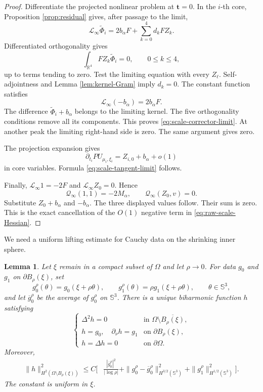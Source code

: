 \documentclass[11pt]{article}
\newtheorem{lemma}[theorem]{Lemma}
\numberwithin{equation}{section}
\begin{document}
\begin{proof}
Differentiate the projected nonlinear problem at $\boldsymbol t=0$. In the $i$-th core, Proposition \ref{prop:residual} gives, after passage to the limit,
\[
\mathcal L_\infty\widetilde\Phi_i
=2b_\alpha F+\sum_{k=0}^{4}d_kFZ_k.
\]
Differentiated orthogonality gives
\[
\int_{\mathbb R^4}FZ_k\widetilde\Phi_i=0,
\qquad 0\leq k\leq4,
\]
up to terms tending to zero. Test the limiting equation with every $Z_\ell$. Self-adjointness and Lemma \ref{lem:kernel-Gram} imply $d_k=0$. The constant function satisfies
\[
\mathcal L_\infty(-b_\alpha)=2b_\alpha F.
\]
The difference $\widetilde\Phi_i+b_\alpha$ belongs to the limiting kernel. The five orthogonality conditions remove all its components. This proves \eqref{eq:scale-corrector-limit}. At another peak the limiting right-hand side is zero. The same argument gives zero.

The projection expansion gives
\[
\partial_{t_i}PU_{\mu_i,\xi_i}
=Z_{i,0}+b_\alpha+o(1)
\]
in core variables. Formula \eqref{eq:scale-tangent-limit} follows.

Finally, $\mathcal L_\infty1=-2F$ and
$\mathcal L_\infty Z_0=0$. Hence
\[
\mathcal Q_\infty(1,1)=-2M_\alpha,
\qquad
\mathcal Q_\infty(Z_0,v)=0.
\]
Substitute $Z_0+b_\alpha$ and $-b_\alpha$. The three displayed values follow. Their sum is zero. This is the exact cancellation of the $O(1)$ negative term in \eqref{eq:raw-scale-Hessian}.
\end{proof}


We need a uniform lifting estimate for Cauchy data on the shrinking inner sphere.

\begin{lemma}\label{lem:small-sphere-lifting}
Let $\xi$ remain in a compact subset of $\Omega$ and let $\rho\to0$.
For data $g_0$ and $g_1$ on $\partial B_\rho(\xi)$, set
\[
g_0^\rho(\theta)=g_0(\xi+\rho\theta),
\qquad
g_1^\rho(\theta)=\rho g_1(\xi+\rho\theta),
\qquad \theta\in\mathbb S^3,
\]
and let $\overline g_0^\rho$ be the average of $g_0^\rho$ on
$\mathbb S^3$.  There is a unique biharmonic function $h$ satisfying
\begin{equation*}
\begin{cases}
\Delta^2h=0&\text{in }\Omega\setminus\overline{B_\rho(\xi)},\\
h=g_0,\quad \partial_\nu h=g_1&\text{on }\partial B_\rho(\xi),\\
h=\Delta h=0&\text{on }\partial\Omega.
\end{cases}
\end{equation*}
Moreover,
\begin{equation}\label{eq:small-sphere-lifting-estimate}
\begin{aligned}
\|h\|_{H^2(\Omega\setminus B_\rho(\xi))}^2
\leq C\Bigg[
&\frac{|\overline g_0^\rho|^2}{|\log\rho|}
+\|g_0^\rho-\overline g_0^\rho\|_{H^{3/2}(\mathbb S^3)}^2+\|g_1^\rho\|_{H^{1/2}(\mathbb S^3)}^2
\Bigg].
\end{aligned}
\end{equation}
The constant is uniform in $\xi$.
\end{lemma}
\end{document}
